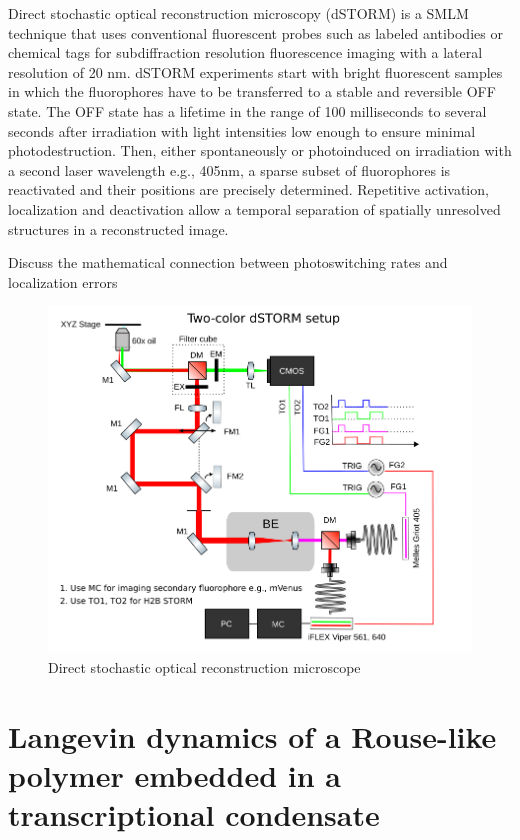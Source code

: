 \documentclass{article}
\begin{document}
Direct stochastic optical reconstruction microscopy (dSTORM) is a SMLM technique that uses conventional fluorescent probes such as labeled antibodies or chemical tags for subdiffraction resolution fluorescence imaging with a lateral resolution of 20 nm. dSTORM experiments start with bright fluorescent samples in which the fluorophores have to be transferred to a stable and reversible OFF state. The OFF state has a lifetime in the range of 100 milliseconds to several seconds after irradiation with light intensities low enough to ensure minimal photodestruction. Then, either spontaneously or photoinduced on irradiation with a second laser wavelength e.g., 405nm, a sparse subset of fluorophores is reactivated and their positions are precisely determined. Repetitive activation, localization and deactivation allow a temporal separation of spatially unresolved structures in a reconstructed image. 

Discuss the mathematical connection between photoswitching rates and localization errors 
 

\begin{figure}
\centering
\includegraphics[width=12cm]{dSTORM.png}
\caption{Direct stochastic optical reconstruction microscope}
\end{figure}

\section{Langevin dynamics of a Rouse-like polymer embedded in a transcriptional condensate}
\end{document}
